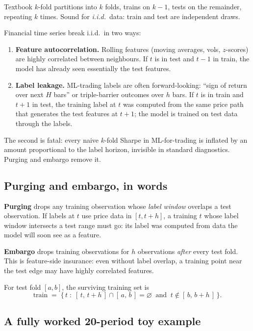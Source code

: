 Textbook $k$-fold partitions into $k$ folds, trains on $k-1$, tests
on the remainder, repeating $k$ times. Sound for
\emph{i.i.d.}\ data: train and test are independent draws.

Financial time series break i.i.d.\ in two ways:
\begin{enumerate}
  \item \textbf{Feature autocorrelation.} Rolling features (moving
  averages, vols, $z$-scores) are highly correlated between
  neighbours. If $t$ is in test and $t - 1$ in train, the model
  has already seen essentially the test features.
  \item \textbf{Label leakage.} ML-trading labels are often
  forward-looking: ``sign of return over next $H$ bars'' or
  triple-barrier outcomes over $h$ bars. If $t$ is in train and
  $t + 1$ in test, the training label at $t$ was computed from
  the same price path that generates the test features at
  $t + 1$; the model is trained on test data through the
  labels.
\end{enumerate}
The second is fatal: every naive $k$-fold Sharpe in ML-for-trading
is inflated by an amount proportional to the label horizon,
invisible in standard diagnostics. Purging and embargo remove it.

\subsection{Purging and embargo, in words}
\label{subsec:bt_purge_embargo_words}

\textbf{Purging} drops any training observation whose \emph{label
window} overlaps a test observation. If labels at $t$ use price data
in $[t, t+h]$, a training $t$ whose label window intersects a test
range must go: its label was computed from data the model will soon
see as a feature.

\textbf{Embargo} drops training observations for $h$ observations
\emph{after} every test fold. This is feature-side insurance: even
without label overlap, a training point near the test edge may have
highly correlated features.

For test fold $[a, b]$, the surviving training set is
\[
\text{train} \;=\;
  \bigl\{\,t \;:\; [\,t,\, t + h\,] \cap [\,a,\, b\,]
        = \varnothing
        \;\;\text{and}\;\; t \notin [\,b,\, b + h\,]\,\bigr\}.
\]

\subsection{A fully worked 20-period toy example}
\label{subsec:bt_cpcv_toy}

